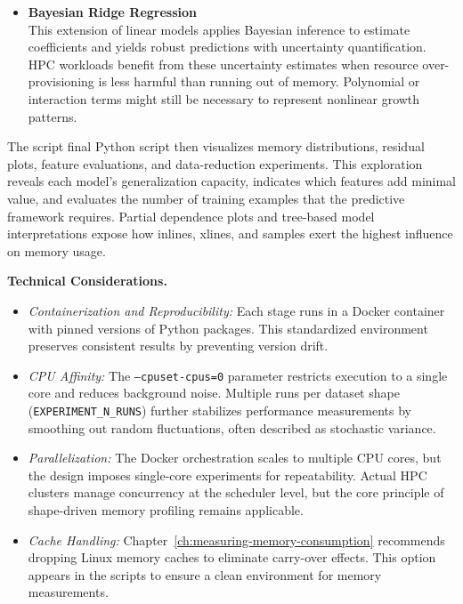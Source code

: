 \begin{itemize}
    \item \textbf{Bayesian Ridge Regression}~\cite{bishop2006pattern}\\
    This extension of linear models applies Bayesian inference to estimate coefficients and yields robust predictions with uncertainty quantification.
    HPC workloads benefit from these uncertainty estimates when resource over-provisioning is less harmful than running out of memory.
    Polynomial or interaction terms might still be necessary to represent nonlinear growth patterns.
\end{itemize}

The script final Python script then visualizes memory distributions, residual plots, feature evaluations, and data-reduction experiments.
This exploration reveals each model’s generalization capacity, indicates which features add minimal value, and evaluates the number of training examples that the predictive framework requires.
Partial dependence plots and tree-based model interpretations expose how inlines, xlines, and samples exert the highest influence on memory usage.

\vspace{1em}
\noindent
\textbf{Technical Considerations.}
\begin{itemize}
    \item \emph{Containerization and Reproducibility:}
    Each stage runs in a Docker container with pinned versions of Python packages.
    This standardized environment preserves consistent results by preventing version drift.
    \item \emph{\ac{CPU} Affinity:}
    The \texttt{--cpuset-cpus=0} parameter restricts execution to a single core and reduces background noise.
    Multiple runs per dataset shape (\texttt{EXPERIMENT\_N\_RUNS}) further stabilizes performance measurements by smoothing out random fluctuations, often described as stochastic variance.
    \item \emph{Parallelization:}
    The Docker orchestration scales to multiple \ac{CPU} cores, but the design imposes single-core experiments for repeatability.
    Actual \ac{HPC} clusters manage concurrency at the scheduler level, but the core principle of shape-driven memory profiling remains applicable.
    \item \emph{Cache Handling:}
    Chapter~\ref{ch:measuring-memory-consumption} recommends dropping Linux memory caches to eliminate carry-over effects.
    This option appears in the scripts to ensure a clean environment for memory measurements.
\end{itemize}

